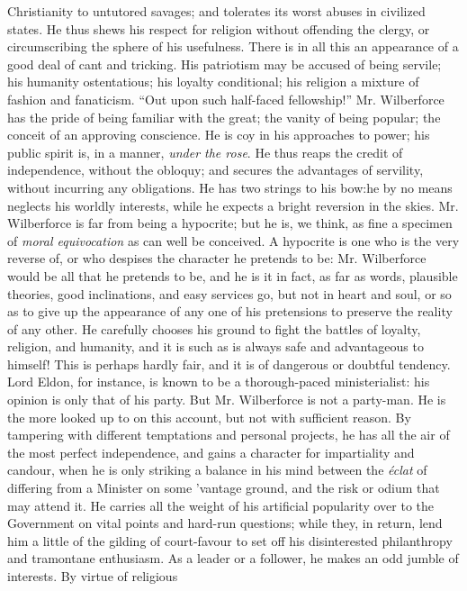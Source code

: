 Christianity to untutored savages; and tolerates its worst abuses
in civilized states.  He thus shews his respect for religion
without offending the clergy, or circumscribing the sphere of his
usefulness. There is in all this an appearance of a good deal of
cant and tricking. His patriotism may be accused of being servile;
his humanity ostentatious; his loyalty conditional; his religion a
mixture of fashion and fanaticism. ``Out upon such half-faced
fellowship!'' Mr. Wilberforce has the pride of being familiar with
the great; the vanity of being popular; the conceit of an
approving conscience. He is coy in his approaches to power; his
public spirit is, in a manner, \emph{under the rose}. He thus
reaps the credit of independence, without the obloquy; and secures
the advantages of servility, without incurring any obligations. He
has two strings to his bow:\textemdash he by no means neglects his
worldly interests, while he expects a bright reversion in the
skies. Mr. Wilberforce is far from being a hypocrite; but he is,
we think, as fine a specimen of \emph{moral equivocation} as can
well be conceived. A hypocrite is one who is the very reverse of,
or who despises the character he pretends to be: Mr.  Wilberforce
would be all that he pretends to be, and he is it in fact, as far
as words, plausible theories, good inclinations, and easy services
go, but not in heart and soul, or so as to give up the appearance
of any one of his pretensions to preserve the reality of any
other. He carefully chooses his ground to fight the battles of
loyalty, religion, and humanity, and it is such as is always safe
and advantageous to himself! This is perhaps hardly fair, and it
is of dangerous or doubtful tendency. Lord Eldon, for instance, is
known to be a thorough-paced ministerialist: his opinion is only
that of his party.  But Mr. Wilberforce is not a party-man. He is
the more looked up to on this account, but not with sufficient
reason. By tampering with different temptations and personal
projects, he has all the air of the most perfect independence, and
gains a character for impartiality and candour, when he is only
striking a balance in his mind between the \emph{éclat} of
differing from a Minister on some 'vantage ground, and the risk or
odium that may attend it. He carries all the weight of his
artificial popularity over to the Government on vital points and
hard-run questions; while they, in return, lend him a little of
the gilding of court-favour to set off his disinterested
philanthropy and tramontane enthusiasm. As a leader or a follower,
he makes an odd jumble of interests. By virtue of religious
